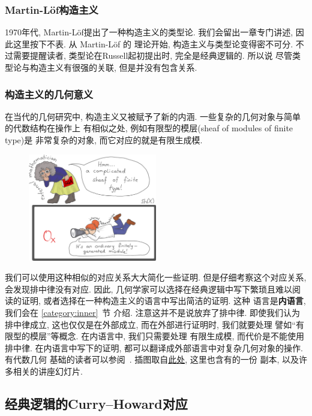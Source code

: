 \documentclass[UTF8]{ctexbook}
\theoremstyle{plain}
\theoremstyle{definition}
\theoremstyle{remark}
\begin{document}
\subsubsection{Martin-L\"of构造主义}
1970年代, Martin-L\"of提出了一种构造主义的类型论.
我们会留出一章专门讲述, 因此这里按下不表. 从 Martin-L\"of 的
理论开始, 构造主义与类型论变得密不可分. 不过需要提醒读者,
类型论在Russell起初提出时, 完全是经典逻辑的. 所以说
尽管类型论与构造主义有很强的关联, 但是并没有包含关系.

\subsubsection{构造主义的几何意义}

在当代的几何研究中, 构造主义又被赋予了新的内涵.
一些复杂的几何对象与简单的代数结构在操作上
有相似之处, 例如有限型的模层(sheaf of modules of finite type)是
非常复杂的对象, 而它对应的就是有限生成模.
\begin{figure}[h]
\centering
\includegraphics[width=0.5\textwidth]{external-internal-small.png}
\end{figure}
我们可以使用这种相似的对应关系大大简化一些证明.
但是仔细考察这个对应关系, 会发现排中律没有对应.
因此, 几何学家可以选择在经典逻辑中写下繁琐且难以阅读的证明,
或者选择在一种构造主义的语言中写出简洁的证明. 这种
语言是\textbf{内语言}, 我们会在 \ref{category:inner}~节
介绍. 注意这并不是说放弃了排中律. 即使我们认为排中律成立,
这也仅仅是在外部成立, 而在外部进行证明时, 我们就要处理
譬如“有限型的模层”等概念. 在内语言中, 我们只需要处理
有限生成模, 而代价是不能使用排中律. 在内语言中写下的证明,
都可以翻译成外部语言中对复杂几何对象的操作. 有代数几何
基础的读者可以参阅~\cite{blechschmidt:2021:internal}.
插图取自\href{https://github.com/iblech/internal-methods}{此处},
这里也含有\cite{blechschmidt:2021:internal}的一份
副本, 以及许多相关的讲座幻灯片.

\subsection{经典逻辑的Curry--Howard对应}\label{ch:classical}
\end{document}

